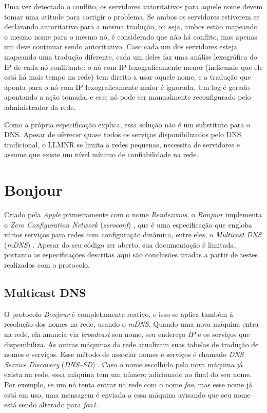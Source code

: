     Uma vez detectado o conflito, os servidores autoritativos para aquele nome
    devem tomar uma atitude para corrigir o problema. Se ambos os servidores
    estiverem se declarando autoritativo para a mesma tradução, ou seja, ambos
    estão mapeando o mesmo nome para o mesmo nó, é considerado que não há conflito,
    mas apenas um deve continuar sendo autoritativo. Caso cada um dos servidores
    esteja mapeando uma tradução diferente, cada um deles faz uma análise lexográfica
    do IP de cada nó conflitante: o nó com IP lexograficamente menor (indicando
    que ele está há mais tempo na rede) tem direito a usar aquele nome, e a
    tradução que aponta para o nó com IP lexograficamente maior é ignorada. Um log
    é gerado apontando a ação tomada, e esse nó pode ser manualmente reconfigurado
    pelo administrador da rede.
    
    Como a própria especificação explica, essa solução não é um substituto para
    o DNS. Apesar de oferecer quase todos os serviços disponibilizados pelo DNS
    tradicional, o LLMNR se limita a redes pequenas, necessita de servidores e
    assume que existe um nível mínimo de confiabilidade na rede.

\section{Bonjour}
\label{Bonjour}

    Criado pela \textit{Apple} primeiramente com o nome \textit{Rendezvous}, o 
    \textit{Bonjour} implementa o \textit{Zero Configuration Network} 
    (\textit{zeroconf}) \cite{zeroconf}, que é uma especificação que engloba vários
    serviços para redes com configuração dinâmica, entre eles, o 
    \textit{Multicast DNS} (\textit{mDNS}) \cite{mdns}. Apesar do seu código ser 
    aberto, sua documentação é limitada, portanto as especificações descritas aqui
    são conclusões tiradas a partir de testes realizados com o protocolo.
  
    \subsection{Multicast DNS}
    \label{MDNS}
  
        O protocolo \textit{Bonjour} é completamente reativo, e isso se aplica também
        à resolução dos nomes na rede, usando o \textit{mDNS}. Quando uma nova máquina
        entra na rede, ela anuncia via \textit{broadcast} seu nome, seu endereço 
        \emph{IP} e os serviços que disponibiliza. As outras máquinas da rede 
        atualizam suas tabelas de tradução de nomes e serviços. Esse método de 
        associar nomes e serviços é chamado \textit{DNS Service Discovery} 
        (\textit{DNS--SD}) \cite{dnssd}. Caso o nome escolhido pela nova máquina 
        já exista na rede, essa máquina tem um número adicionado ao final do seu 
        nome. Por exemplo, se um nó tenta entrar na rede com o nome \emph{foo}, mas
        esse nome já está em uso, uma mensagem é enviada a essa máquina avisando 
        que seu nome está sendo alterado para \emph{foo1}.

